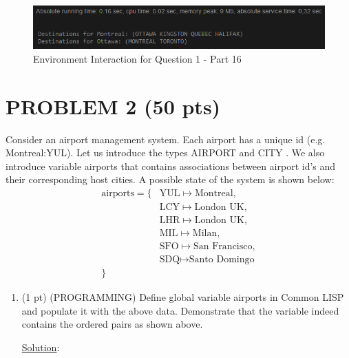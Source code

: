 \documentclass[12pt]{article}
\begin{document}
\begin{spacing}{1.5}
\begin{enumerate}
        \begin{figure}[htp]
            \centering
            \includegraphics[width=1\textwidth]{static/getDestinations-1-16.PNG}
            \caption{Environment Interaction for Question 1 - Part 16}
            \label{fig:figure}
        \end{figure}
		           
	\end{enumerate}

    \section*{PROBLEM 2 (50 pts)}

    Consider an airport management system. Each airport has a unique id (e.g. Montreal:YUL).
    Let us introduce the types AIRPORT and CITY . We also introduce variable airports that
    contains associations between airport id's and their corresponding host cities. A possible
    state of the system is shown below:
    \begin{align*}
        \text{airports} = \{
        & \text{YUL} \mapsto \text{Montreal}, \\
        & \text{LCY} \mapsto \text{London UK}, \\
        & \text{LHR} \mapsto \text{London UK}, \\
        & \text{MIL} \mapsto \text{Milan}, \\
        & \text{SFO} \mapsto \text{San Francisco}, \\
        & \text{SDQ} \mapsto \text{Santo Domingo} \\
        \}
    \end{align*}

    \begin{enumerate}
        \item (1 pt) (PROGRAMMING) Define global variable airports in Common LISP and
        populate it with the above data. Demonstrate that the variable indeed contains the
        ordered pairs as shown above.

        \underline{Solution}:
        


\end{enumerate}
\end{spacing}
\end{document}
